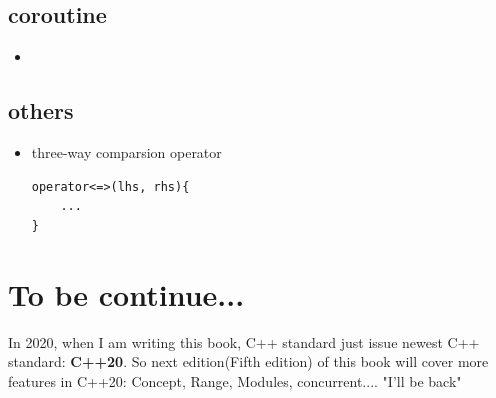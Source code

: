 \documentclass[a4paper,11pt,twoside]{book}
\begin{document}
\subsection{coroutine}
\begin{itemize}
	\item 
\end{itemize}


\subsection{others}
\begin{itemize}
	\item three-way comparsion operator
\begin{lstlisting}
operator<=>(lhs, rhs){
	...
}
\end{lstlisting}	


\end{itemize}

\section{To be continue...}
In 2020, when I am writing this book,  C++ standard just issue newest C++ standard: \textbf{C++20}. So next edition(Fifth edition) of this book will cover more features in C++20: Concept, Range, Modules, concurrent....
\newline
"I'll be back"


\end{document}
